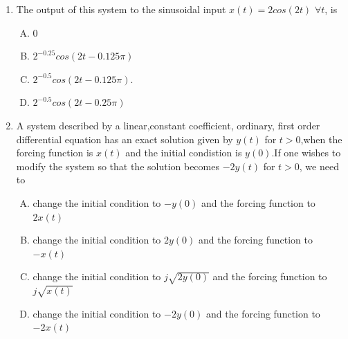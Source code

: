 \documentclass[journal,12pt,twocolumn]{IEEEtran}
\begin{document}
\begin{enumerate}[1.]
\begin{enumerate}[(A)]
\end{enumerate}



\item The output of this system to the sinusoidal input $x(t)=2cos(2t)$ $\forall t$, is

\begin{enumerate}[(A)]

\setlength\itemsep{1em}

\item 0
\item $2^{-0.25}cos(2t-0.125\pi)$
\item $2^{-0.5}cos(2t-0.125\pi)$.
\item $2^{-0.5}cos(2t-0.25\pi)$


\end{enumerate}

\item A system described by a linear,constant coefficient, ordinary, first order differential equation has an exact solution given by $y(t)$ for $t>0$,when the forcing function is $x(t)$ and the initial condistion is $y(0)$.If one wishes to modify the system so that the solution becomes $-2y(t)$ for $t>0$, we need to
\begin{enumerate}[(A)]

\setlength\itemsep{2mm}

\item change the initial condition to $-y(0)$ and the forcing function to $2x(t)$
\item change the initial condition to $2y(0)$ and the forcing function to $-x(t)$
\item change the initial condition to $j\sqrt{2y(0)}$ and the forcing function to $j\sqrt{x(t)}$
\item change the initial condition to $-2y(0)$ and the forcing function to $-2x(t)$
\end{enumerate}


\end{enumerate}
\end{document}
